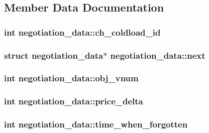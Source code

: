 \subsection{Member Data Documentation}
\hypertarget{structnegotiation__data_a6cb50dbb7c300cfce4c2dc344faf8aa9}{
\subsubsection[{ch\-\_\-coldload\-\_\-id}]{\setlength{\rightskip}{0pt plus 5cm}int negotiation\-\_\-data\-::ch\-\_\-coldload\-\_\-id}}\label{structnegotiation__data_a6cb50dbb7c300cfce4c2dc344faf8aa9}
\hypertarget{structnegotiation__data_a63d08f24690474f04312e697f0275c22}{
\subsubsection[{next}]{\setlength{\rightskip}{0pt plus 5cm}struct {\bf negotiation\-\_\-data}$\ast$ negotiation\-\_\-data\-::next}}\label{structnegotiation__data_a63d08f24690474f04312e697f0275c22}
\hypertarget{structnegotiation__data_ac2790f175dbb74ef8e3d5f2f116fe4c0}{
\subsubsection[{obj\-\_\-vnum}]{\setlength{\rightskip}{0pt plus 5cm}int negotiation\-\_\-data\-::obj\-\_\-vnum}}\label{structnegotiation__data_ac2790f175dbb74ef8e3d5f2f116fe4c0}
\hypertarget{structnegotiation__data_a8f19b98b96a5b01517ef97903e1f9642}{
\subsubsection[{price\-\_\-delta}]{\setlength{\rightskip}{0pt plus 5cm}int negotiation\-\_\-data\-::price\-\_\-delta}}\label{structnegotiation__data_a8f19b98b96a5b01517ef97903e1f9642}
\hypertarget{structnegotiation__data_a0deef4af9ec1998d699589a5fe108d82}{
\subsubsection[{time\-\_\-when\-\_\-forgotten}]{\setlength{\rightskip}{0pt plus 5cm}int negotiation\-\_\-data\-::time\-\_\-when\-\_\-forgotten}}\label{structnegotiation__data_a0deef4af9ec1998d699589a5fe108d82}
